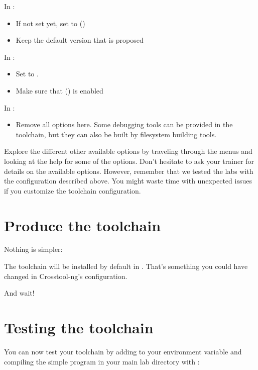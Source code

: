 In :
\begin{itemize}
  \item If not set yet, set  to 
        ()
  \item Keep the default version that is proposed
\end{itemize}

In :
\begin{itemize}
  \item Set  to .
  \item Make sure that  () is enabled
\end{itemize}

In :
\begin{itemize}
\item Remove all options here. Some debugging tools can be provided
      in the toolchain, but they can also be built by filesystem
      building tools.
\end{itemize}

Explore the different other available options by traveling through the
menus and looking at the help for some of the options. Don't hesitate
to ask your trainer for details on the available options. However,
remember that we tested the labs with the configuration described
above. You might waste time with unexpected issues if you customize the
toolchain configuration.

\section{Produce the toolchain}

Nothing is simpler:


The toolchain will be installed by default in .
That's something you could have changed in Crosstool-ng's configuration.

And wait!

\section{Testing the toolchain}

You can now test your toolchain by adding
{} to your
 environment variable and compiling the simple
 program in your main lab directory with
:

